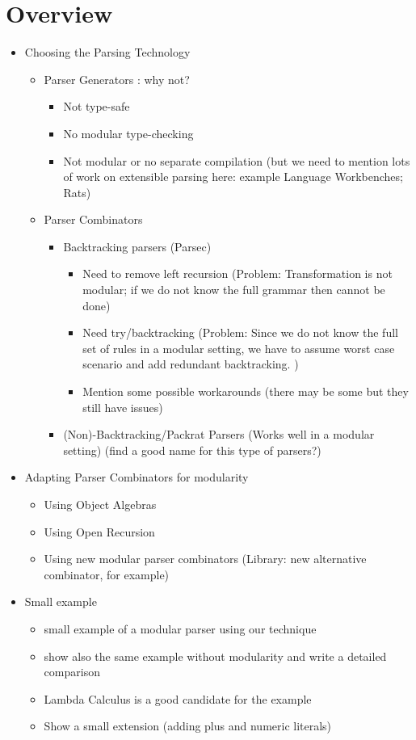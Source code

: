 \section{Overview}\label{sec:overview}

\begin{itemize}
\item Choosing the Parsing Technology
    \begin{itemize}
    \item Parser Generators : why not?
        \begin{itemize}
            \item Not type-safe
            \item No modular type-checking
            \item Not modular or no separate compilation (but we need to mention lots of work on extensible parsing here: example Language Workbenches; Rats)
        \end{itemize}
    \item Parser Combinators
        \begin{itemize}
        \item Backtracking parsers (Parsec)
            \begin{itemize}
            \item Need to remove left recursion (Problem: Transformation is not modular; if we do not know the full grammar then cannot be done)
            \item Need try/backtracking (Problem: Since we do not know the full set of rules in a modular setting, we have to assume worst case scenario and add redundant backtracking. )
            \item Mention some possible workarounds (there may be some but they still have issues)
            \end{itemize}
        \item (Non)-Backtracking/Packrat Parsers (Works well in a modular setting) (find a good name for this type of parsers?)
        \end{itemize}
    \end{itemize}
\item Adapting Parser Combinators for modularity
    \begin{itemize}
    \item Using Object Algebras
    \item Using Open Recursion
    \item Using new modular parser combinators (Library: new alternative combinator, for example)
    \end{itemize}
\item Small example
    \begin{itemize}
    \item small example of a modular parser using our technique
    \item show also the same example without modularity and write a detailed comparison
    \item Lambda Calculus is a good candidate for the example
    \item Show a small extension (adding plus and numeric literals)
    \end{itemize}
\end{itemize}
